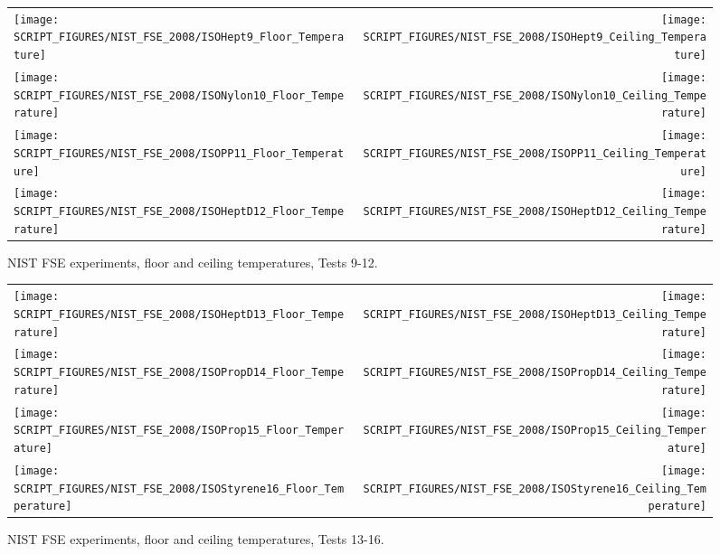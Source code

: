 \begin{figure}[p]
\begin{tabular*}{\textwidth}{l@{\extracolsep{\fill}}r}
\texttt{[image: SCRIPT\_FIGURES/NIST\_FSE\_2008/ISOHept9\_Floor\_Temperature]} &
\texttt{[image: SCRIPT\_FIGURES/NIST\_FSE\_2008/ISOHept9\_Ceiling\_Temperature]} \\
\texttt{[image: SCRIPT\_FIGURES/NIST\_FSE\_2008/ISONylon10\_Floor\_Temperature]} &
\texttt{[image: SCRIPT\_FIGURES/NIST\_FSE\_2008/ISONylon10\_Ceiling\_Temperature]} \\
\texttt{[image: SCRIPT\_FIGURES/NIST\_FSE\_2008/ISOPP11\_Floor\_Temperature]} &
\texttt{[image: SCRIPT\_FIGURES/NIST\_FSE\_2008/ISOPP11\_Ceiling\_Temperature]} \\
\texttt{[image: SCRIPT\_FIGURES/NIST\_FSE\_2008/ISOHeptD12\_Floor\_Temperature]} &
\texttt{[image: SCRIPT\_FIGURES/NIST\_FSE\_2008/ISOHeptD12\_Ceiling\_Temperature]}
\end{tabular*}
\caption[NIST FSE experiments, floor and ceiling temperatures, Tests 9-12]{NIST FSE experiments, floor and ceiling temperatures, Tests 9-12.}
\label{NIST_FSE_2008_Surface_Temp_2}
\end{figure}

\begin{figure}[p]
\begin{tabular*}{\textwidth}{l@{\extracolsep{\fill}}r}
\texttt{[image: SCRIPT\_FIGURES/NIST\_FSE\_2008/ISOHeptD13\_Floor\_Temperature]} &
\texttt{[image: SCRIPT\_FIGURES/NIST\_FSE\_2008/ISOHeptD13\_Ceiling\_Temperature]} \\
\texttt{[image: SCRIPT\_FIGURES/NIST\_FSE\_2008/ISOPropD14\_Floor\_Temperature]} &
\texttt{[image: SCRIPT\_FIGURES/NIST\_FSE\_2008/ISOPropD14\_Ceiling\_Temperature]} \\
\texttt{[image: SCRIPT\_FIGURES/NIST\_FSE\_2008/ISOProp15\_Floor\_Temperature]} &
\texttt{[image: SCRIPT\_FIGURES/NIST\_FSE\_2008/ISOProp15\_Ceiling\_Temperature]} \\
\texttt{[image: SCRIPT\_FIGURES/NIST\_FSE\_2008/ISOStyrene16\_Floor\_Temperature]} &
\texttt{[image: SCRIPT\_FIGURES/NIST\_FSE\_2008/ISOStyrene16\_Ceiling\_Temperature]}
\end{tabular*}
\caption[NIST FSE experiments, floor and ceiling temperatures, Tests 13-16]{NIST FSE experiments, floor and ceiling temperatures, Tests 13-16.}
\label{NIST_FSE_2008_Surface_Temp_3}
\end{figure}

